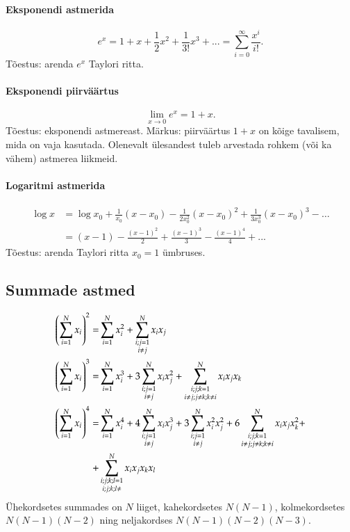 \documentclass[a4paper]{article}
\numberwithin{equation}{subsection}
\begin{document}
\paragraph{Eksponendi astmerida}
\begin{equation}
 e^x = 1 + x + \frac{1}{ 2}x^2 + \frac{1}{ 3!}x^3 + ... = \sum^\infty_{i=0}
\frac{x^i }{ i!}.
\end{equation}
Tõestus: arenda $e^x$ Taylori ritta.

\paragraph{Eksponendi piirväärtus}
\begin{equation}
 \lim_{x\to 0} e^x = 1+x.
\end{equation}
Tõestus: eksponendi astmereast. Märkus: piir\-väärtus $1+x$ on kõige
tavalisem, mida on vaja kasutada. Olenevalt ülesandest tuleb arvestada
rohkem (või ka vähem) astmerea liikmeid.


\paragraph{Logaritmi astmerida}
\begin{align}
 \log x 
  &=
    \log x_{0} +
    \frac{1}{x_{0}} (x - x_{0}) -
    \frac{1}{2x_{0}^{2}} (x - x_{0})^{2} +
    \frac{1}{3x_{0}^{3}} (x - x_{0})^{3} -
    \dots
  \\
  &= (x-1) - 
    \frac{(x-1)^2 }{ 2} + 
    \frac{(x-1)^3 }{ 3} - 
    \frac{(x-1)^4 }{4} + ...
\end{align}
Tõestus: arenda Taylori ritta $x_0=1$ ümbruses.




\newpage
\subsection{Summade astmed}

\begin{align}
\left( \sum_{i=1}^N x_i \right)^2 = &
  \sum_{i=1}^N x_i^2 + \sum_{\substack{i;j=1 \\ i\ne j}}^N
  x_i x_j
  \label{eq:(sum x)^2}\\
\left( \sum_{i=1}^N x_i \right)^3 = &
  \sum_{i=1}^N x_i^3 + 3 \sum_{\substack{i;j=1 \\ i\ne j}}^N
  x_i x_j^2 + \sum_{\substack{i;j;k=1 \\ i\ne j; j\ne k; k \ne i}}^N
  x_i x_j x_k\\
\left( \sum_{i=1}^N x_i \right)^4 = &
  \sum_{i=1}^N x_i^4 +
  4\sum_{\substack{i;j=1 \\ i\ne j}}^N x_i x_j^3 +
  3\sum_{\substack{i;j=1 \\ i\ne j}}^N x_i^2 x_j^2 +
  6\sum_{\substack{i;j;k=1 \\ i\ne j; j\ne k; k \ne i}}^N
    x_i x_j x_k^2 + \notag\\
  + &
  \sum_{\substack{i;j;k;l=1\\ i;j;k;l\ne}}^N x_i x_j
    x_k x_l
\end{align}
Ühekordsetes summades on $N$ liiget, kahekordsetes $N(N-1)$,
kolmekordsetes $N(N-1)(N-2)$ ning neljakordses $N(N-1)(N-2)(N-3)$.
\end{document}
